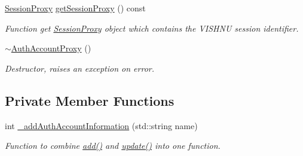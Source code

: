 \begin{DoxyCompactItemize}
\hyperlink{classSessionProxy}{SessionProxy} \hyperlink{classAuthAccountProxy_a182a09c6f84fe11977a6f1e82ae6fb1d}{getSessionProxy} () const 
\begin{DoxyCompactList}\small\item\em Function get \hyperlink{classSessionProxy}{SessionProxy} object which contains the VISHNU session identifier. \item\end{DoxyCompactList}\item 
\hypertarget{classAuthAccountProxy_a41650f6ad7154ef5fa11a344187d87c7}{
\hyperlink{classAuthAccountProxy_a41650f6ad7154ef5fa11a344187d87c7}{$\sim$AuthAccountProxy} ()}
\label{classAuthAccountProxy_a41650f6ad7154ef5fa11a344187d87c7}

\begin{DoxyCompactList}\small\item\em Destructor, raises an exception on error. \item\end{DoxyCompactList}\end{DoxyCompactItemize}
\subsection*{Private Member Functions}
\begin{DoxyCompactItemize}
\item 
int \hyperlink{classAuthAccountProxy_a4960e89f4f9fdc291623a7563725cef1}{\_\-addAuthAccountInformation} (std::string name)
\begin{DoxyCompactList}\small\item\em Function to combine \hyperlink{classAuthAccountProxy_ac76c8bf2a8ae166f17059ba2a21d11f8}{add()} and \hyperlink{classAuthAccountProxy_a0180343cdf4652fc8690184f0843f818}{update()} into one function. \item\end{DoxyCompactList}\end{DoxyCompactItemize}
